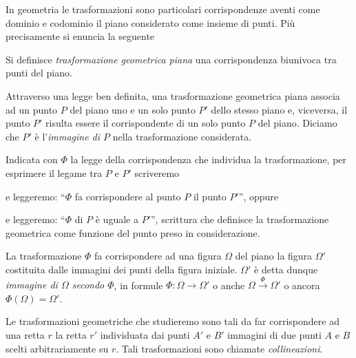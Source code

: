 In geometria le trasformazioni sono particolari corrispondenze aventi 
come dominio e codominio il piano considerato come insieme di punti. 
Più precisamente si enuncia la seguente

\begin{definizione}
Si definisce \emph{trasformazione geometrica piana} una 
corrispondenza biunivoca tra punti del piano.
\end{definizione}

Attraverso una legge ben definita, una trasformazione geometrica 
piana associa ad un punto $P$ del piano uno e un solo punto $P'$ 
dello stesso piano e, viceversa, il punto $P'$ risulta essere il 
corrispondente di un solo punto $P$ del piano. Diciamo che $P'$ è 
l'\emph{immagine di $P$} nella trasformazione considerata.


Indicata con $\Phi$ la legge della corrispondenza che individua la 
trasformazione, per esprimere il legame tra $P$ e $P'$ scriveremo


\noindent e leggeremo: ``$\Phi$ fa corrispondere al punto $P$ il 
punto $P'$'', oppure


\noindent e leggeremo: ``$\Phi$ di $P$ è uguale a $P'$'', scrittura 
che definisce la trasformazione geometrica come funzione del punto 
preso in considerazione.

La trasformazione $\Phi$ fa corrispondere ad una figura $\Omega$ del 
piano la figura $\Omega'$ costituita dalle immagini dei punti della 
figura iniziale. $\Omega'$ è detta dunque \emph{immagine di $\Omega$ 
secondo $\Phi$}, in formule $\Phi: \Omega \rightarrow \Omega'$ o 
anche $\Omega\overset{\Phi}{\rightarrow}\Omega'$ o ancora 
$\Phi(\Omega)=\Omega'$.

Le trasformazioni geometriche che studieremo sono tali da far 
corrispondere ad una retta $r$ la retta $r'$ individuata dai punti 
$A'$ e $B'$ immagini di due punti $A$ e $B$ scelti arbitrariamente su 
$r$. Tali trasformazioni sono chiamate \emph{collineazioni}.

